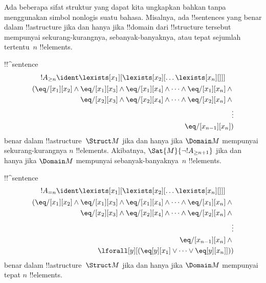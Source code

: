 \documentclass[../../../include/open-logic-section]{subfiles}
\begin{document}


\begin{explain}
Ada beberapa sifat struktur yang dapat kita ungkapkan bahkan tanpa
menggunakan simbol nonlogis suatu bahasa. Misalnya, ada !!{sentence}s yang
benar dalam !!a{structure} jika dan hanya jika !!{domain} dari !!{structure}
tersebut mempunyai sekurang-kurangnya, sebanyak-banyaknya, atau tepat sejumlah
tertentu~$n$ !!{element}s.
\end{explain}

\begin{prop}
!!^{sentence}
\begin{multline*}
  !A_{\ge n} \ident \lexists[x_1][\lexists[x_2][\dots\lexists[x_n][{}]]]\\
  \begin{aligned}
  (\eq/[x_1][x_2] \land {}
  \eq/[x_1][x_3] \land \eq/[x_1][x_4] \land \dots \land \eq/[x_1][x_n] \land {}\\
\eq/[x_2][x_3] \land \eq/[x_2][x_4] \land \dots \land {} \eq/[x_2][x_n] \land {} \\
\vdots\\
\eq/[x_{n-1}][x_n])
\end{aligned}
\end{multline*}
benar dalam !!a{structure}~$\Struct M$ jika dan hanya jika $\Domain M$
mempunyai sekurang-kurangnya $n$ !!{element}s. Akibatnya,
$\Sat{M}{\lnot !A_{\ge n+1}}$ jika dan hanya jika $\Domain M$ mempunyai
sebanyak-banyaknya~$n$ !!{element}s.

\end{prop}

\begin{prop}
!!^{sentence}
\begin{multline*}
!A_{= n} \ident \lexists[x_1][\lexists[x_2][\dots\lexists[x_n][{}]]] \\
\begin{aligned}
  (\eq/[x_1][x_2] \land {}
  \eq/[x_1][x_3] \land \eq/[x_1][x_4] \land \dots \land \eq/[x_1][x_n] \land {}\\
\eq/[x_2][x_3] \land \eq/[x_2][x_4] \land \dots \land {} \eq/[x_2][x_n] \land {} \\
\vdots\\
\eq/[x_{n-1}][x_n] \land {} \\
\lforall[y][(\eq[y][x_1] \lor \dots \lor \eq[y][x_n]]))
\end{aligned}
\end{multline*}
benar dalam !!a{structure}~$\Struct M$ jika dan hanya jika $\Domain M$
mempunyai tepat $n$ !!{element}s.
\end{prop}
\end{document}
